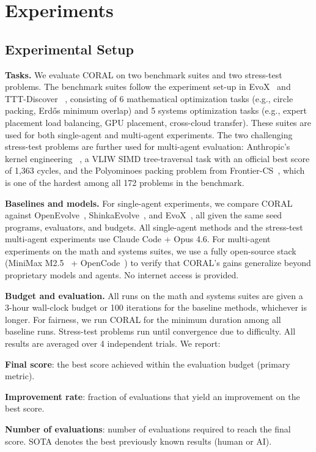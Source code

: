 
\vspace{-4pt}
\section{Experiments}
\vspace{-4pt}

\subsection{Experimental Setup}
\label{sec:exp_setup}

\textbf{Tasks.}
We evaluate CORAL on two benchmark suites and two stress-test problems.
The benchmark suites follow the experiment set-up in EvoX~\citep{liu2026evox} and TTT-Discover ~\citep{yuksekgonul2026tttdiscover}, consisting of 6 mathematical optimization tasks (e.g., circle packing, Erd\H{o}s minimum overlap) and 5 systems optimization tasks (e.g., expert placement load balancing, GPU placement, cross-cloud transfer). These suites are used for both single-agent and multi-agent experiments.
The two challenging stress-test problems are further used for multi-agent evaluation: Anthropic's kernel engineering ~\citep{anthropic_takehome}, a VLIW SIMD tree-traversal task with an official best score of 1,363 cycles, and the Polyominoes packing problem from Frontier-CS~\citep{mang2025frontiercs}, which is one of the hardest among all 172 problems in the benchmark.

\textbf{Baselines and models.}
For single-agent experiments, we compare CORAL against OpenEvolve~\citep{sharma2025openevolve}, ShinkaEvolve~\citep{lange2025shinkaevolve}, and EvoX~\citep{liu2026evox}, all given the same seed programs, evaluators, and budgets. All single-agent methods and the stress-test multi-agent experiments use Claude Code + Opus 4.6. For multi-agent experiments on the math and systems suites, we use a fully open-source stack (MiniMax M2.5~\citep{minimax2026m25} + OpenCode~\citep{opencode2025}) to verify that CORAL's gains generalize beyond proprietary models and agents. No internet access is provided.

\textbf{Budget and evaluation.}
All runs on the math and systems suites are given a 3-hour wall-clock budget or 100 iterations for the baseline methods, whichever is longer. For fairness, we run CORAL for the minimum duration among all baseline runs. Stress-test problems run until convergence due to difficulty. All results are averaged over 4 independent trials. We report:
\squishlisttwo
  \item \textbf{Final score}: the best score achieved within the evaluation budget (primary metric).
  \item \textbf{Improvement rate}: fraction of evaluations that yield an improvement on the best score.
  \item \textbf{Number of evaluations}: number of evaluations required to reach the final score.
\squishend
{\setlength{\fboxsep}{1pt}\colorbox{myyellow!15}{SOTA}} denotes the best previously known results (human or AI).

